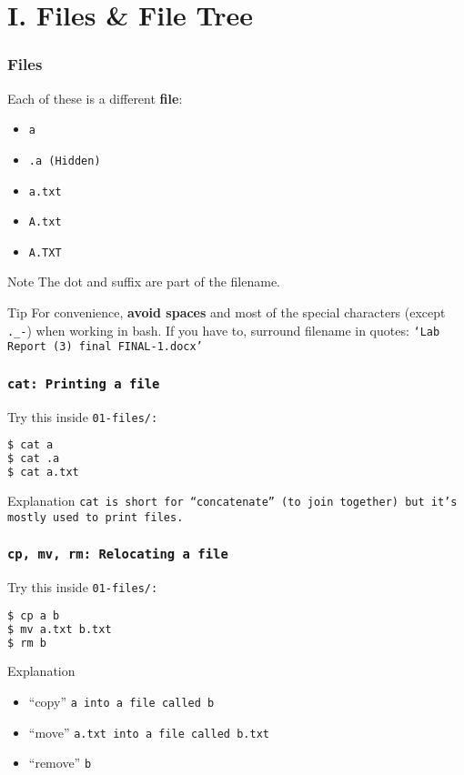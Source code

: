 \section{I. Files \& File Tree}
\begin{frame}[fragile]
\frametitle{Files}
Each of these is a different \textbf{file}:
\begin{itemize}
    \item \tt{a}
    \item \tt{.a} (Hidden)
    \item \tt{a.txt}
    \item \tt{A.txt}
    \item \tt{A.TXT}
\end{itemize}

\begin{block}{Note}
    The dot and suffix are part of the filename.
\end{block}

\begin{block}{Tip}
    For convenience, \textbf{avoid spaces} and most of the special characters
    (except \verb|._-|) when working in bash. If you have to, surround filename
    in quotes: \tt{`Lab Report (3) final FINAL-1.docx'}
\end{block}
\end{frame}

\begin{frame}[fragile]
    \frametitle{\tt{cat}: Printing a file}
Try this inside \tt{01-files/}:
\begin{lstlisting}[language=bash]
$ cat a
$ cat .a
$ cat a.txt
\end{lstlisting}
\begin{block}{Explanation}
    \tt{cat} is short for ``concatenate'' (to join together) but it's
    mostly used to print files.
\end{block}
\end{frame}

\begin{frame}[fragile]
\frametitle{\tt{cp, mv, rm}: Relocating a file}
Try this inside \tt{01-files/}:
\begin{lstlisting}[language=bash]
$ cp a b
$ mv a.txt b.txt
$ rm b
\end{lstlisting}
\begin{block}{Explanation}
    \begin{itemize}
        \item ``copy'' \tt{a} into a file called \tt{b}
        \item ``move'' \tt{a.txt} into a file called \tt{b.txt}
        \item ``remove'' \tt{b}
    \end{itemize}
\end{block}
\end{frame}

